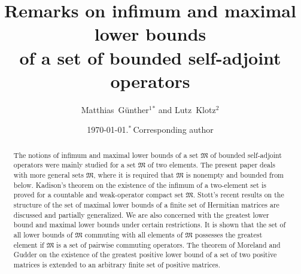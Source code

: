 \documentclass[12pt, a4paper, reqno, twoside]{amsart}
\numberwithin{equation}{section}
\newcommand{\frakM}{\mathfrak M}
\theoremstyle{definition}
\theoremstyle{remark}
\theoremstyle{mystyle}
\begin{document}
\setcounter{page}{1}

\title[Remarks on infimum and maximal lower bounds of a set of 
operators]{Remarks on infimum and maximal lower bounds\\
of a set of bounded self-adjoint operators}

\author[M.~G\"unther \MakeLowercase{and} L.~Klotz]%
{Matthias~G\"unther$^1$$^{\ast}$ \MakeLowercase{and} Lutz~Klotz$^{2}$}

\address{\hspace*{0pt}%
Mathematisches Institut, Universit\"at Leipzig, 
PF 10\,09\,20, 04109 Leipzig, Ger\-many.}


\address{\hspace*{0pt}%
Wiesenstr.~2, 08309 Eibenstock, OT Sosa, Germany.}




\date{\today.\newline\indent$^{*}$\,Corresponding author}

\begin{abstract}
The notions of infimum and maximal lower bounds of a set $\frakM$ of
bounded self-adjoint operators were mainly studied for a set $\frakM$
of two elements. The present paper deals with more general sets
$\frakM$, where it is required that $\frakM$ is nonempty and bounded
from below. Kadison's theorem on the existence of the infimum of a
two-element set is proved for a countable and weak-operator compact
set $\frakM$. Stott's recent results on the structure of the set of
maximal lower bounds of a finite set of Hermitian matrices are
discussed and partially generalized. We are also concerned with
the greatest lower bound and maximal lower bounds under certain
restrictions. It is shown that the set of all lower bounds of $\frakM$
commuting with all elements of $\frakM$ possesses the greatest element if
$\frakM$ is a set of pairwise commuting operators. The theorem of
Moreland and Gudder on the existence of the greatest positive lower
bound of a set of two positive matrices is extended to an arbitrary
finite set of positive matrices.
\end{abstract}
\end{document}
